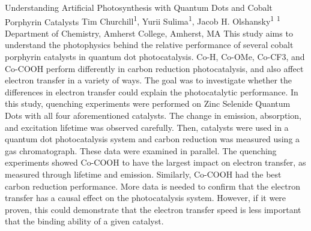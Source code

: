 \makeabstract
    {
    Understanding Artificial Photosynthesis with Quantum Dots and Cobalt Porphyrin Catalysts
    }
    {
    Tim Churchill\textsuperscript{1}, Yurii Sulima\textsuperscript{1}, Jacob H. Olshansky\textsuperscript{1}
    }
    {
    \textsuperscript{1} Department of Chemistry, Amherst College, Amherst, MA
    }
    {
    This study aims to understand the photophysics behind the relative performance of several cobalt porphyrin catalysts in quantum dot photocatalysis. Co-H, Co-OMe, Co-CF3, and Co-COOH perform differently in carbon reduction photocatalysis, and also affect electron transfer in a variety of ways. The goal was to investigate whether the differences in electron transfer could explain the photocatalytic performance.
    }
    {
    In this study, quenching experiments were performed on Zinc Selenide Quantum Dots with all four aforementioned catalysts. The change in emission, absorption, and excitation lifetime was observed carefully. Then, catalysts were used in a quantum dot photocatalysis system and carbon reduction was measured using a gas chromatograph. These data were examined in parallel.
    }
    {
    The quenching experiments showed Co-COOH to have the largest impact on electron transfer, as measured through lifetime and emission. Similarly, Co-COOH had the best carbon reduction performance. 
    }
    {
    More data is needed to confirm that the electron transfer has a causal effect on the photocatalysis system. However, if it were proven, this could demonstrate that the electron transfer speed is less important that the binding ability of a given catalyst.
    }

    \newpage
    